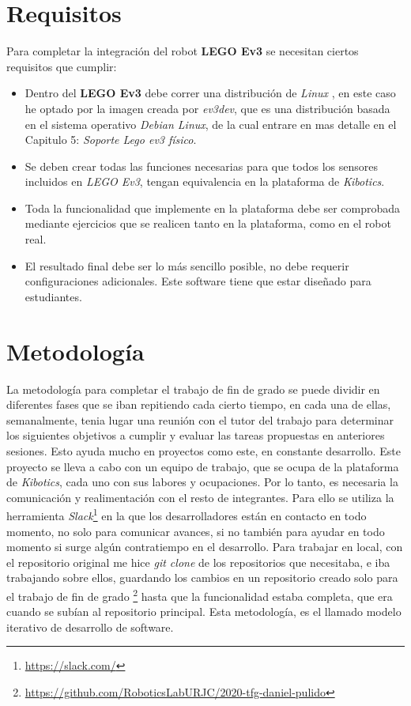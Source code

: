 \section{Requisitos}
\label{sec:requisitos}
Para completar la integración del robot \textbf{LEGO Ev3} se necesitan ciertos requisitos que cumplir:
\begin{itemize}
    \item Dentro del \textbf{LEGO Ev3} debe correr una distribución de \textit{Linux} , en este caso he optado por la imagen creada por \textit{ev3dev}, que es una distribución basada en el sistema operativo \textit{Debian Linux}, de la cual entrare en mas detalle en el Capitulo 5: \textit{Soporte Lego ev3 físico}.
\item Se deben crear todas las funciones necesarias para que todos los sensores incluidos en \textit{LEGO Ev3}, tengan equivalencia en la plataforma de \textit{Kibotics}.
\item Toda la funcionalidad que implemente en la plataforma debe ser comprobada mediante ejercicios que se realicen tanto en la plataforma, como en el robot real.
    \item El resultado final debe ser lo más sencillo posible, no debe requerir configuraciones adicionales. Este software tiene que estar diseñado para estudiantes. 
\end{itemize}    

\section{Metodología}
\label{sec:metodologia}

La metodología para completar el trabajo de fin de grado se puede dividir en diferentes fases que se iban repitiendo cada cierto tiempo, en cada una de ellas, semanalmente, tenia lugar una reunión con el tutor del trabajo para determinar los siguientes objetivos a cumplir y evaluar las tareas propuestas en anteriores sesiones. Esto ayuda mucho en proyectos como este, en constante desarrollo.\newline
Este proyecto se lleva a cabo con un equipo de trabajo, que se ocupa de la plataforma de \textit{Kibotics}, cada uno con sus labores y ocupaciones. Por lo tanto, es necesaria la comunicación y realimentación con el resto de integrantes. Para ello se utiliza la herramienta \textit{Slack}\footnote{\url{https://slack.com/}} en la que los desarrolladores están en contacto en todo momento, no solo para comunicar avances, si no también para ayudar en todo momento si surge algún contratiempo en el desarrollo.\newline
Para trabajar en local, con el repositorio original me hice \textit{git clone} de los repositorios que necesitaba, e iba trabajando sobre ellos, guardando los cambios en un repositorio creado solo para el trabajo de fin de grado \footnote{\url{https://github.com/RoboticsLabURJC/2020-tfg-daniel-pulido}} hasta que la funcionalidad estaba completa, que era cuando se subían al repositorio principal. Esta metodología, es el llamado modelo iterativo de desarrollo de software.



